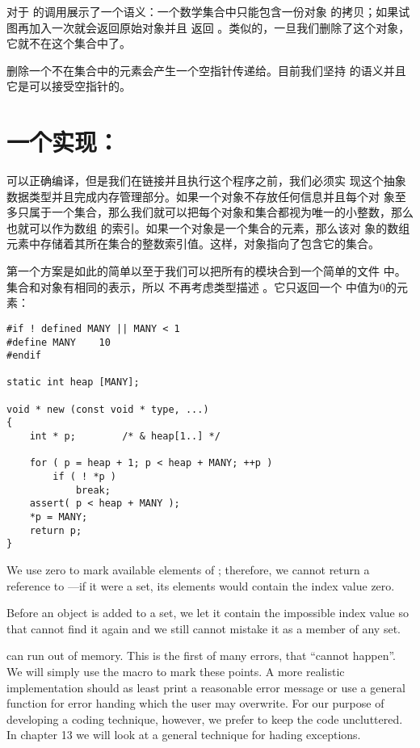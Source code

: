 对于 的调用展示了一个语义：一个数学集合中只能包含一份对象
 的拷贝；如果试图再加入一次就会返回原始对象并且 返回
。类似的，一旦我们删除了这个对象，它就不在这个集合中了。

删除一个不在集合中的元素会产生一个空指针传递给。目前我们坚持
 的语义并且它是可以接受空指针的。

\section{一个实现：}
 可以正确编译，但是我们在链接并且执行这个程序之前，我们必须实
现这个抽象数据类型并且完成内存管理部分。如果一个对象不存放任何信息并且每个对
象至多只属于一个集合，那么我们就可以把每个对象和集合都视为唯一的小整数，那么
也就可以作为数组 的索引。如果一个对象是一个集合的元素，那么该对
象的数组元素中存储着其所在集合的整数索引值。这样，对象指向了包含它的集合。

第一个方案是如此的简单以至于我们可以把所有的模块合到一个简单的文件
 中。集合和对象有相同的表示，所以 不再考虑类型描述
。它只返回一个 中值为0的元素：
\begin{lstlisting}
#if ! defined MANY || MANY < 1
#define MANY	10
#endif

static int heap [MANY];

void * new (const void * type, ...)
{
	int * p;		/* & heap[1..] */

	for ( p = heap + 1; p < heap + MANY; ++p )
		if ( ! *p )
			break;
	assert( p < heap + MANY );
	*p = MANY;
	return p;
}
\end{lstlisting}
We use zero to mark available elements of ; therefore, we
cannot return a reference to  ---if it were a set, its
elements would contain the index value zero.

Before an object is added to a set, we let it contain the impossible index
value  so that  cannot find it again and we still
cannot mistake it as a member of any set.

 can run out of memory. This is the first of many errors, that
``cannot happen''. We will simply use the  macro
 to mark these points. A more realistic implementation should
as least print a reasonable error message or use a general function for
error handing which the user may overwrite. For our purpose of developing a
coding technique, however, we prefer to keep the code uncluttered. In
chapter 13 we will look at a general technique for hading exceptions.

